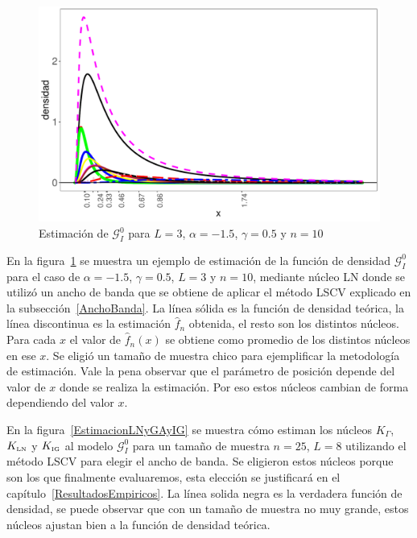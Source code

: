 \begin{figure}[hbt]
	\centering
	\includegraphics[scale=0.5]{../../Figures/Tesis/Capitulo5/EstimacionDensidadconLN.pdf}
	\caption{\label{EstimacionLN}Estimación de $\mathcal{G}_I^0$ para $L=3$, $\alpha=-1.5$, $\gamma=0.5$ y $n=10$}
\end{figure}

En la figura~\ref{EstimacionLN} se muestra un ejemplo de estimación de la función de densidad $\mathcal{G}_I^0$ para el caso de $\alpha=-1.5$, $\gamma=0.5$, $L=3$ y $n=10$, mediante núcleo LN donde se utilizó un ancho de banda que se obtiene de aplicar el método LSCV explicado en la subsección~\ref{AnchoBanda}. La línea sólida es la función de densidad teórica, la línea discontinua es la estimación $\widehat{f}_n$ obtenida, el resto son los distintos núcleos. Para cada $x$ el valor de $\widehat{f}_n(x)$ se obtiene como promedio de los distintos núcleos en ese $x$. Se eligió un tamaño de muestra chico para ejemplificar la metodología de estimación. Vale la pena observar que el parámetro de posición depende del valor de $x$ donde se realiza la estimación. Por eso estos núcleos cambian de forma dependiendo del valor $x$.

En la figura~\ref{EstimacionLNyGAyIG} se muestra cómo estiman los núcleos $K_{\Gamma}$, $K_{\text{\tiny{LN}}}$ y $K_{\text{\tiny{IG}}}$ al modelo $\mathcal{G}_I^0$ para un tamaño de muestra $n=25$, $L=8$ utilizando el método LSCV para elegir el ancho de banda. Se eligieron estos núcleos porque son los que finalmente evaluaremos, esta elección se justificará en el capítulo~\ref{ResultadosEmpiricos}. 
La línea solida negra es la verdadera función de densidad, se puede observar que con un tamaño de muestra no muy grande, estos núcleos ajustan bien a la función de densidad teórica.


